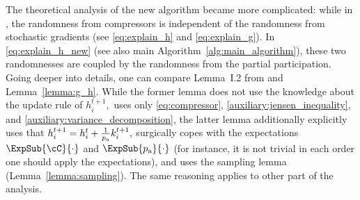 \documentclass{article}
\newcommand{\algorithmname}{DASHA-PP}
\newcommand*{\probavailable}{\ensuremath{p_{\textnormal{a}}}}
\begin{document}
The theoretical analysis of the new algorithm became more complicated: while in , the randomness from compressors is independent of the randomness from stochastic gradients (see \eqref{eq:explain_h} and \eqref{eq:explain_g}). In \eqref{eq:explain_h_new} (see also main Algorithm~\ref{alg:main_algorithm}), these two randomnesses are coupled by the randomness from the partial participation. Going deeper into details, one can compare Lemma~I.2 from \citep{tyurin2022dasha} and Lemma~\ref{lemma:g_h}. While the former lemma does not use the knowledge about the update rule of $h^{t+1}_i,$ uses only \eqref{eq:compressor}, \eqref{auxiliary:jensen_inequality}, and \eqref{auxiliary:variance_decomposition}, the latter lemma additionally explicitly uses that $h^{t+1}_i = h^t_i + \frac{1}{\probavailable}k^{t+1}_i,$ surgically copes with the expectations $\ExpSub{\cC}{\cdot}$ and $\ExpSub{\probavailable}{\cdot}$ (for instance, it is not trivial in each order one should apply the expectations), and uses the sampling lemma (Lemma~\ref{lemma:sampling}). The same reasoning applies to other part of the analysis. 


\end{document}
